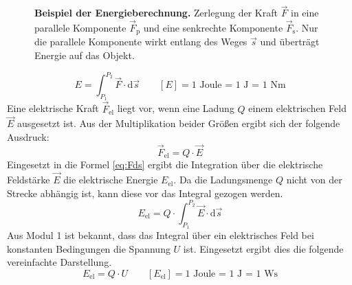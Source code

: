 {\begin{figure}[H]
	\centering
			
			\caption{\textbf{Beispiel der Energieberechnung.} Zerlegung der Kraft \(\vec{F}\) in eine parallele Komponente \(\vec{F}_\mathrm{p}\) und eine senkrechte Komponente \(\vec{F}_\mathrm{s}\). Nur die parallele Komponente wirkt entlang des Weges \(\vec{s}\) und überträgt Energie auf das Objekt.}
			\label{fig:E=F*s_s}
\end{figure}
\begin{equation}
	E = \int_{P_\mathrm{1}}^{P_\mathrm{2}} \vec{F} \cdot \mathrm{d}\vec{s} \quad\quad [E] = \text{1 Joule = 1 J = 1 Nm} \label{eq:Fds}
\end{equation}
Eine elektrische Kraft $\vec{F}_\mathrm{{el}}$ liegt vor, wenn eine Ladung $Q$ einem elektrischen Feld $\vec{E}$ ausgesetzt ist.
Aus der Multiplikation beider Größen ergibt sich der folgende Ausdruck:
\begin{equation}
	\vec{F}_\mathrm{{el}} = Q \cdot \vec{E}
\end{equation}
Eingesetzt in die Formel \ref{eq:Fds} ergibt die Integration über die elektrische Feldstärke $\vec{E}$ die elektrische Energie $E_\mathrm{{el}}$.
Da die Ladungsmenge $Q$ nicht von der Strecke abhängig ist, kann diese vor das Integral gezogen werden.
\begin{equation}
	E_\mathrm{el} = Q \cdot \int_{P_\mathrm{1}}^{P_\mathrm{2}} \vec{E} \cdot \mathrm{d}\vec{s}
\end{equation}
Aus Modul 1 ist bekannt, dass das Integral über ein elektrisches Feld bei konstanten Bedingungen die Spannung $U$ ist.
Eingesetzt ergibt dies die folgende vereinfachte Darstellung.
\begin{equation}
	 E_\mathrm{el} = Q \cdot U \quad\quad [E_\mathrm{el}] = \text{1 Joule = 1 J = 1 Ws}
\end{equation}
}


